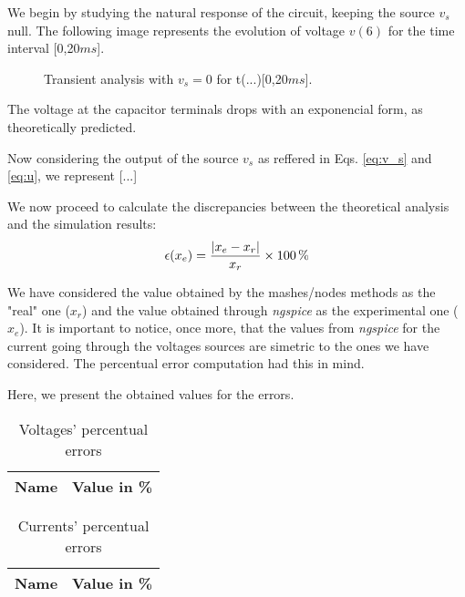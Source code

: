 \par We begin by studying the natural response of the circuit, keeping the source $v_s$ null. The following image represents the evolution of voltage $v(6)$ for the time interval [0,20$ms$].

\begin{figure}[H]
  \centering
  \caption{Transient analysis with $v_s =0$ for t(...)[0,20$ms$].}
  \label{fig:sim_3}
\end{figure}

The voltage at the capacitor terminals drops with an exponencial form, as theoretically predicted.

\par Now considering the output of the source $v_s$ as reffered in Eqs. \ref{eq:v_s} and \ref{eq:u}, we represent [...]








\par
We now proceed to calculate the discrepancies between the theoretical analysis and the simulation results:
\begin{equation}
  \centering
  \epsilon (x_e)=\frac{|x_e-x_r|}{x_r} \times 100\,\%
  \label{eq:error}
\end{equation}

We have considered the value obtained by the mashes/nodes methods as the "real" one ($x_r$) and the value obtained through \emph{ngspice} as the experimental one ($x_e$). It is important to notice, once more, that the values from \emph{ngspice} for the current going through the voltages sources are simetric to the ones we have considered. The percentual error computation had this in mind.

Here, we present the obtained values for the errors.

\begin{table}[H]
  \centering
  \begin{tabular}{|l|r|}
    \hline
    {\bf Name} & {\bf Value in \%} \\ \hline
  \end{tabular}
  \caption{Voltages' percentual errors}
  \label{tab:error_tensoes}
\end{table}



\begin{table}[H]
  \centering
  \begin{tabular}{|l|r|}
    \hline
    {\bf Name} & {\bf Value in \%} \\ \hline
  \end{tabular}
  \caption{Currents' percentual errors }
  \label{tab:error_current}
\end{table}

